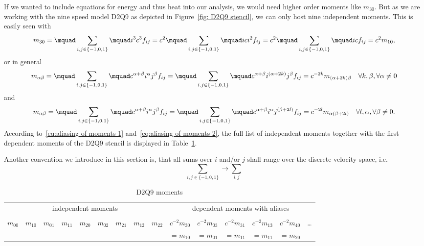 If we wanted to include equations for energy and thus heat into our analysis, we would need higher order moments like $m_{30}$.
But as we are working with the nine speed model D2Q9 as depicted in Figure~\ref{fig: D2Q9 stencil}, we can only host nine independent moments.
This is easily seen with
\begin{equation}
  m_{30} = \mquad\sum_{i,j \in \{-1,0,1\}}\mquad i^3 c^3 f_{ij} = c^2\mquad\sum_{i,j \in \{-1,0,1\}}\mquad ic i^2 f_{ij} = c^2 \mquad\sum_{i,j \in \{-1,0,1\}}\mquad ic f_{ij} = c^2 m_{10},
\end{equation}
or in general
\begin{equation}
  \label{eq:aliasing of moments 1}
  m_{\alpha\beta}
  = \mquad\sum_{i,j \in \{-1,0,1\}}\mquad c^{\alpha+\beta} i^\alpha j^\beta f_{ij}
  = \mquad\sum_{i,j \in \{-1,0,1\}}\mquad c^{\alpha+\beta}i^{(\alpha+2k)} j^\beta f_{ij}
  = c^{-2k} m_{(\alpha+2k)\beta} \quad \forall k,\beta, \forall \alpha \neq 0
\end{equation}
and
\begin{equation}
  \label{eq:aliasing of moments 2}
  m_{\alpha\beta}
  = \mquad\sum_{i,j \in \{-1,0,1\}}\mquad c^{\alpha+\beta} i^\alpha j^\beta f_{ij}
  = \mquad\sum_{i,j \in \{-1,0,1\}}\mquad c^{\alpha+\beta} i^\alpha j^{(\beta+2l)} f_{ij}
  = c^{-2l}m_{\alpha(\beta+2l)} \quad \forall l, \alpha, \forall \beta \neq 0.
\end{equation}
According to~\eqref{eq:aliasing of moments 1} and~\eqref{eq:aliasing of moments 2}, the full list of independent moments together with the first dependent moments of the D2Q9 stencil is displayed in Table~\ref{table:D2Q9 moments}.

Another convention we introduce in this section is, that all sums over $i$ and/or $j$ shall range over the discrete velocity space, i.e.
\begin{equation*}
  \sum_{i,j \in \{-1,0,1\}} \rightarrow \sum_{i,j}
\end{equation*}

\setlength{\tabcolsep}{2.9pt}
\begin{table} [t]
  \centering
  \begin{tabular}{r rr rrr rr r rrrrr r}
    \toprule
    \multicolumn{9}{c}{independent moments} & \multicolumn{6}{c}{dependent moments with aliases}   \\
    \cmidrule(lr){1-9}\cmidrule(lr){10-15} \\
    $m_{00}$
    & $m_{10}$
    & $m_{01}$
    & $m_{11}$
    & $m_{20}$
    & $m_{02}$
    & $m_{21}$
    & $m_{12}$
    & $m_{22}$
    & $c^{-2}m_{30}$
    & $c^{-2}m_{03}$
    & $c^{-2}m_{31}$
    & $c^{-2}m_{13}$
    & $c^{-2}m_{40}$
    & \ldots \\
    &&&&&&&&
    & = $m_{10}$
    & = $m_{01}$
    & = $m_{11}$
    & = $m_{11}$
    & = $m_{20}$ & \\
    \bottomrule
  \end{tabular}
  \caption{D2Q9 moments}\label{table:D2Q9 moments}
\end{table}
